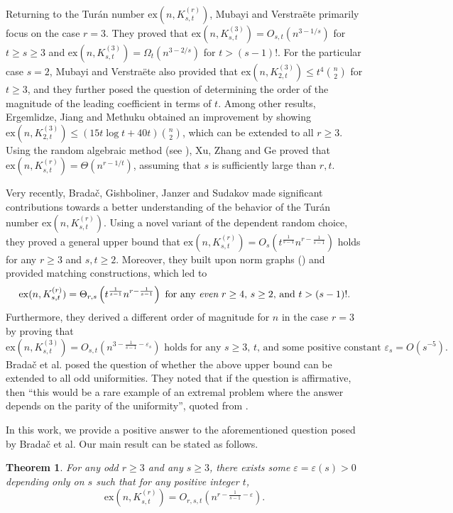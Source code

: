 \documentclass[11pt]{article}
\newtheorem{thm}[dfn]{Theorem}
\def\ex{\mathrm{ex}}
\begin{document}
Returning to the Tur\'an number $\ex(n,K^{(r)}_{s,t})$,
Mubayi and Verstra\"ete \cite{MuVe04} primarily focus on the case $r=3$.
They proved that $\ex(n,K^{(3)}_{s,t})=O_{s,t}(n^{3-1/s})$ for $t\ge s\ge 3$ and $\ex(n,K^{(3)}_{s,t})=\Omega_t(n^{3-2/s})$ for $t>(s-1)!$.
For the particular case $s=2$, Mubayi and Verstra\"ete \cite{MuVe04} also provided that $\ex(n,K^{(3)}_{2,t})\leq t^4\binom{n}{2}$ for $t\ge 3$, and they further posed the question of determining the order of the magnitude of the leading coefficient in terms of $t$.  
Among other results, Ergemlidze, Jiang and Methuku \cite{EJM20} obtained an improvement by showing $\ex(n,K^{(3)}_{2,t})\leq (15t\log t+40t)\binom{n}{2}$, which can be extended to all $r\geq 3$.
Using the random algebraic method (see \cite{Bukh15,BD}), Xu, Zhang and Ge \cite{XZG20,XZG21} proved that $\ex(n,K^{(r)}_{s,t})=\Theta(n^{r-1/t})$, assuming that $s$ is sufficiently large than $r,t$.


Very recently, Brada\v{c}, Gishboliner, Janzer and Sudakov \cite{BGJS23} made significant contributions towards
a better understanding of the behavior of the Tur\'an number $\ex(n,K^{(r)}_{s,t})$.
Using a novel variant of the dependent random choice,
they proved a general upper bound that $\ex(n,K^{(r)}_{s,t})=O_s\left(t^{\frac{1}{s-1}}n^{r-\frac{1}{s-1}}\right)$ holds for any $r\geq 3$ and $s,t\geq 2$.
Moreover, they built upon norm graphs (\cite{ARS99,KRS96}) and provided matching constructions, which led to $$\ex(n,K^{(r)}_{s,t})=\Theta_{r,s}\left(t^{\frac{1}{s-1}}n^{r-\frac{1}{s-1}}\right)\mbox{ for any {\it even} $r\geq 4$, $s\geq 2$, and $t>(s-1)!$.}$$
Furthermore, they derived a different order of magnitude for $n$ in the case $r=3$ by proving that
$$\ex(n,K_{s,t}^{(3)})=O_{s,t}\left(n^{3-\frac{1}{s-1}- \varepsilon_s}\right) \mbox{ holds for any $s\ge 3$, $t$, and some positive constant $\varepsilon_s=O(s^{-5})$}.$$
Brada\v{c} et al. posed the question of whether the above upper bound can be extended to all odd uniformities.
They noted that if the question is affirmative, then ``this would be a rare example of an extremal problem where the answer depends on the parity of the uniformity'', quoted from \cite{BGJS23}.

In this work, we provide a positive answer to the aforementioned question posed by Brada\v{c} et al. Our main result can be stated as follows.

\begin{thm}\label{thm: main}
For any odd $r\geq 3$ and any $s\geq 3$, there exists some $\varepsilon=\varepsilon(s)>0$ depending only on $s$ such that for any positive integer $t$, $$\ex(n,K_{s,t}^{(r)})=O_{r,s,t}\left(n^{r-\frac{1}{s-1}- \varepsilon}\right).$$
\end{thm}
\end{document}
